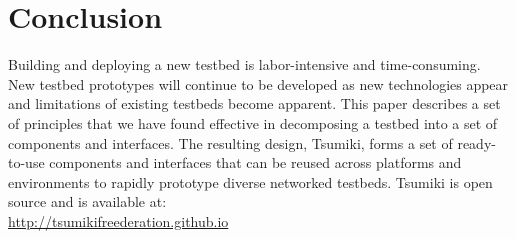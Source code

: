 \section{Conclusion}\label{sec-conclusion}

Building and deploying a new testbed is labor-intensive and
time-consuming. New testbed prototypes will continue to be developed
as new technologies appear and limitations of existing testbeds become
apparent. This paper describes a set of principles that we have found
effective in decomposing a testbed into a set of components and interfaces.
The resulting design, Tsumiki, forms a set of
ready-to-use components and interfaces that can be reused across platforms and
environments to rapidly prototype diverse networked testbeds. Tsumiki is
open source and is available at:\\
\url{http://tsumikifreederation.github.io}

